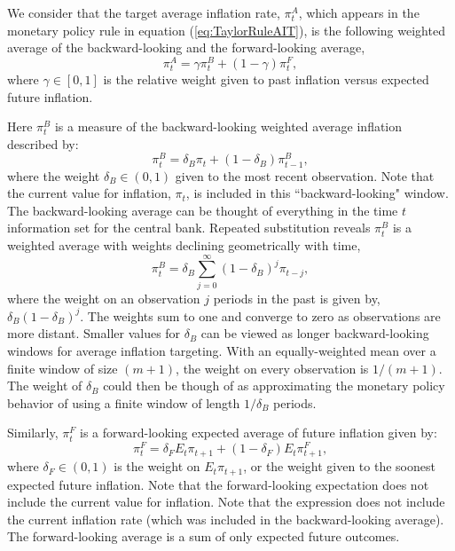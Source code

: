 \documentclass[english,authoryear,12pt]{elsarticle}
\begin{document}
We consider that the target average inflation rate, $\pi_t^A$, which appears in the monetary policy rule in equation (\ref{eq:TaylorRuleAIT}), is the following weighted average of the backward-looking and the forward-looking average,
\begin{equation}
	\pi_t^A = \gamma \pi_t^B + (1-\gamma) \pi_t^F,
\end{equation}
where $\gamma \in [0,1]$ is the relative weight given to past inflation versus expected future inflation.

Here $\pi_t^B$ is a measure of the backward-looking weighted average inflation described by:
\begin{equation}\label{eq:backward}
	\pi_t^B = \delta_B \pi_t + (1-\delta_B) \pi_{t-1}^B,
\end{equation}
where the weight $\delta_B \in (0,1)$ given to the most recent observation. Note that the current value for inflation, $\pi_t$, is included in this ``backward-looking" window. The backward-looking average can be thought of everything in the time $t$ information set for the central bank. Repeated substitution reveals $\pi_t^B$ is a weighted average with weights declining geometrically with time,
\begin{equation}\label{eq:backward_all}
	\pi_t^B = \delta_B \sum_{j=0}^{\infty} (1-\delta_B)^j \pi_{t-j},
\end{equation}
where the weight on an observation $j$ periods in the past is given by, $\delta_B (1-\delta_B)^j$. The weights sum to one and converge to zero as observations are more distant. Smaller values for $\delta_B$ can be viewed as longer backward-looking windows for average inflation targeting. With an equally-weighted mean over a finite window of size $(m+1)$, the weight on every observation is $1/(m+1)$. The weight of $\delta_B$ could then be though of as approximating the monetary policy behavior of using a finite window of length $1 / \delta_B$ periods.

Similarly, $\pi_t^F$ is a forward-looking expected average of future inflation given by:
\begin{equation}\label{eq:forward}
	\pi_t^F = \delta_F E_t \pi_{t+1} + (1-\delta_F) E_t \pi_{t+1}^F,
\end{equation}
where $\delta_F \in (0,1)$ is the weight on $E_t \pi_{t+1}$, or the weight given to the soonest expected future inflation. Note that the forward-looking expectation does not include the current value for inflation. Note that the expression does not include the current inflation rate (which was included in the backward-looking average). The forward-looking average is a sum of only expected future outcomes.
\end{document}
